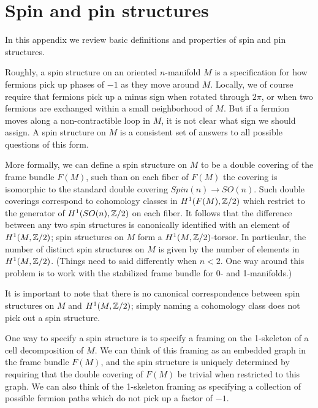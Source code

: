

\section{Spin and pin structures} \label{spin_and_pin}

%
In this appendix we review basic definitions and properties of spin and pin structures.

\medskip

Roughly, a spin structure on an oriented $n$-manifold $M$ is a specification for how fermions pick up phases of $-1$ as they move around $M$.
Locally, we of course require that fermions pick up a minus sign when rotated through $2\pi$,
or when two fermions are exchanged within a small neighborhood of $M$.
But if a fermion moves along a non-contractible loop in $M$, it is not clear what sign we should assign.
A spin structure on $M$ is a consistent set of answers to all possible questions of this form.

More formally, we can define a spin structure on $M$ to be a double covering of the frame bundle $F(M)$, such than on each fiber of $F(M)$
the covering is isomorphic to the standard double covering $Spin(n) \to SO(n)$.
Such double coverings correspond to cohomology classes in $H^1(F(M), \mathbb{Z}/2)$ which restrict to the generator of $H^1(SO(n), \mathbb{Z}/2)$ on each fiber.
It follows that the difference between any two spin structures is canonically identified
with an element of $H^1(M, \mathbb{Z}/2)$; spin structures on $M$ form a $H^1(M, \mathbb{Z}/2)$-torsor.
In particular, the number of distinct spin structures on $M$ is given by the number of elements in $H^1(M, \mathbb{Z}/2)$.
(Things need to said differently when $n<2$.
One way around this problem is to work with the stabilized frame bundle for 0- and 1-manifolds.)

It is important to note that there is no canonical correspondence between spin structures on $M$ and $H^1(M, \mathbb{Z}/2)$; simply naming
a cohomology class does not pick out a spin structure.

One way to specify a spin structure is to specify a framing on the 1-skeleton of a cell decomposition of $M$.
We can think of this framing as an embedded graph in the frame bundle $F(M)$, and the spin structure is uniquely determined by requiring
that the double covering of $F(M)$ be trivial when restricted to this graph.
We can also think of the 1-skeleton framing as specifying a collection of possible fermion paths which do not pick up a factor of $-1$.

